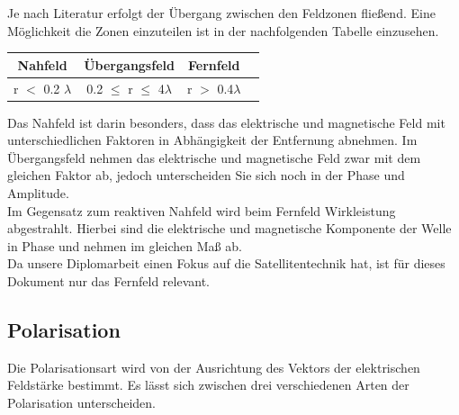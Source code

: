 \documentclass[12pt]{scrreprt}
\begin{document}
	Je nach Literatur erfolgt der Übergang zwischen den Feldzonen fließend. Eine Möglichkeit die Zonen einzuteilen ist in der nachfolgenden Tabelle einzusehen.
	
	\begin{center}
		\begin{tabular}[h]{|c|c|c| p{}}
			\hline
			Nahfeld & Übergangsfeld & Fernfeld\\
			\hline
			r $<$ 0.2 $\lambda$ & 0.2 $\leq$ r $\leq$ 4$\lambda$ & r $>$ 0.4$\lambda$\\
			\hline
		\end{tabular}
	\end{center}
	
	Das Nahfeld ist darin besonders, dass das elektrische und magnetische Feld mit unterschiedlichen Faktoren in Abhängigkeit der Entfernung abnehmen. Im Übergangsfeld nehmen das elektrische und magnetische Feld zwar mit dem gleichen Faktor ab, jedoch unterscheiden Sie sich noch in der Phase und Amplitude.\\
	
	Im Gegensatz zum reaktiven Nahfeld wird beim Fernfeld Wirkleistung abgestrahlt. Hierbei sind die elektrische und magnetische Komponente der Welle in Phase und nehmen im gleichen Maß ab.\\
	
	Da unsere Diplomarbeit einen Fokus auf die Satellitentechnik hat, ist für dieses Dokument nur das Fernfeld relevant. 
	
	\subsection{Polarisation}
	Die Polarisationsart wird von der Ausrichtung des Vektors der elektrischen Feldstärke bestimmt. Es lässt sich zwischen drei verschiedenen Arten der Polarisation unterscheiden.\\
	
\end{document}
